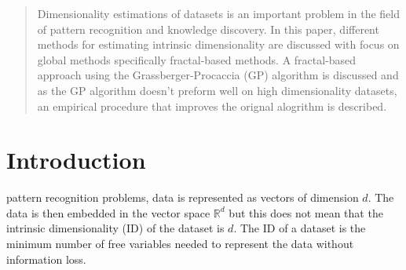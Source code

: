 \documentclass[journal]{IEEEtran}
\begin{document}
\begin{abstract}
Dimensionality estimations of datasets is an important problem in the field of pattern recognition and knowledge discovery.
 In this paper, different methods for estimating intrinsic dimensionality are discussed with focus on global methods specifically 
 fractal-based methods.  A fractal-based approach using the Grassberger-Procaccia (GP) algorithm is discussed and as the GP algorithm doesn't
 preform well on high dimensionality datasets, an empirical procedure that improves the orignal alogrithm is described.
\end{abstract}







%
\IEEEpeerreviewmaketitle



\section{Introduction}
% 
% 
% 
% 
 pattern recognition problems, data is represented as vectors 
of dimension \(d\). The data is then embedded in the vector space \( \mathbb{R}^d \) 
but this does not mean that the intrinsic dimensionality (ID) of the dataset is \(d\). 
The ID of a dataset is the minimum number of free variables needed to represent the data without information 
loss. 
\end{document}
